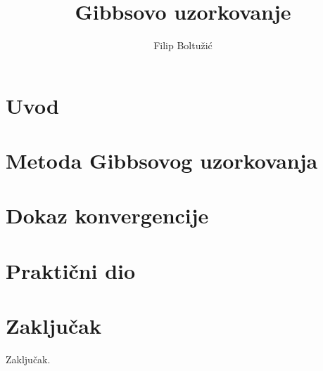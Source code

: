 \documentclass[times, utf8, seminar]{fer}
\begin{document}

\title{Gibbsovo uzorkovanje}

\author{Filip Boltužić}
\maketitle

\tableofcontents

\chapter{Uvod}


\chapter{Metoda Gibbsovog uzorkovanja}


\chapter{Dokaz konvergencije}


\chapter{Praktični dio}


\chapter{Zaključak}
Zaključak.



\end{document}
